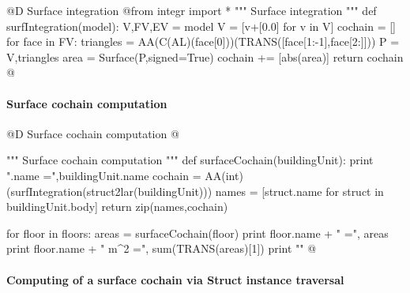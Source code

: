 \documentclass[11pt,oneside]{article}    %
\begin{document}
@D Surface integration
@{from integr import *
""" Surface integration """
def surfIntegration(model):
    V,FV,EV = model
    V = [v+[0.0] for v in V]
    cochain = []
    for face in FV:
        triangles = AA(C(AL)(face[0]))(TRANS([face[1:-1],face[2:]]))
        P = V,triangles
        area = Surface(P,signed=True) 
        cochain += [abs(area)]
    return cochain
@}

\paragraph{Surface cochain computation}

@D Surface cochain computation
@{""" Surface cochain computation """
def surfaceCochain(buildingUnit):
    print "\nbuildingUnit.name =",buildingUnit.name
    cochain = AA(int)(surfIntegration(struct2lar(buildingUnit)))
    names = [struct.name for struct in buildingUnit.body]
    return zip(names,cochain)

for floor in floors:
    areas = surfaceCochain(floor)
    print floor.name + " =", areas
    print floor.name + " m^2 =", sum(TRANS(areas)[1])
    print ""
@}


\paragraph{Computing of a surface cochain via Struct instance traversal}
\end{document}
